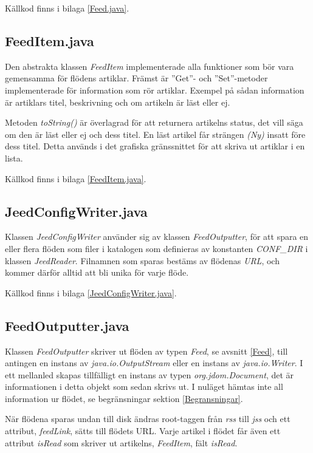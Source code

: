 \documentclass[titlepage, twoside, a4paper, 12pt]{article}
\begin{document}
Källkod finns i bilaga \ref{Feed.java}.

\subsection{FeedItem.java}\label{FeedItem}
Den abstrakta klassen \textit{FeedItem} implementerade alla funktioner
som bör vara gemensamma för flödens artiklar. Främst är ''Get''- och
''Set''-metoder implementerade för information som rör
artiklar. Exempel på sådan information är artiklars titel,
beskrivning och om artikeln är läst eller ej.

Metoden \textit{toString()} är överlagrad för att returnera artikelns
status, det vill säga om den är läst eller ej och dess titel. En läst
artikel får strängen \textit{(Ny)} insatt före dess titel. Detta
används i det grafiska gränssnittet för att skriva ut artiklar i en
lista.

Källkod finns i bilaga \ref{FeedItem.java}.


\subsection{JeedConfigWriter.java}\label{JeedConfigWriter}
Klassen \textit{JeedConfigWriter} använder sig av klassen
\textit{FeedOutputter}, för att spara en eller flera flöden som filer
i katalogen som definieras av konstanten \textit{CONF\_DIR} i klassen
\textit{JeedReader}. Filnamnen som sparas bestäms av flödenas
\textit{URL}, och kommer därför alltid att bli unika för varje flöde.

Källkod finns i bilaga \ref{JeedConfigWriter.java}.

\subsection{FeedOutputter.java}\label{FeedOutputter}
Klassen \textit{FeedOutputter} skriver ut flöden av typen
\textit{Feed}, se avsnitt \ref{Feed}, till antingen en instans av
\textit{java.io.OutputStream} eller en instans av
\textit{java.io.Writer}. I ett mellanled skapas tillfälligt en instans
av typen \textit{org.jdom.Document}, det är informationen i detta
objekt som sedan skrivs ut. I nuläget hämtas inte all information ur
flödet, se begränsningar sektion \ref{Begransningar}. %

När flödena sparas undan till disk ändras root-taggen från
\textit{rss} till \textit{jss} och ett attribut, \textit{feedLink},
sätts till flödets URL. Varje artikel i flödet får även ett attribut
\textit{isRead} som skriver ut artikelns, \textit{FeedItem}, fält
\textit{isRead}.
\end{document}
